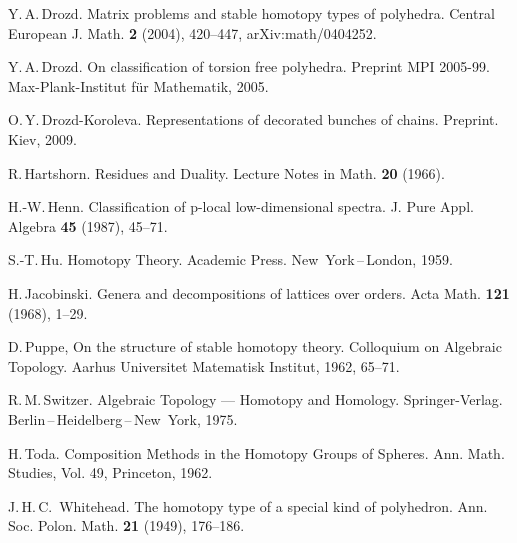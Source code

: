 \documentclass[12pt,a4paper]{amsart}
\theoremstyle{definition}
\theoremstyle{remark}
\numberwithin{equation}{section}
\begin{document}
\begin{thebibliography}{99}
 Y.\,A.\,Drozd.
 Matrix problems and stable homotopy types of polyhedra. Central
 European J. Math. {\bf2} (2004), 
 420--447, arXiv:math/0404252. 

 Y.\,A.\,Drozd.
 On classification of torsion free polyhedra. Preprint MPI 2005-99.
 Max-Plank-Institut f\"ur Mathematik, 2005.

 O.\,Y.\,Drozd-Koroleva. Representations of decorated bunches of
 chains. Preprint. Kiev, 2009.

 R.\,Hartshorn.
 Residues and Duality. Lecture Notes in  Math. {\bf20} (1966).

 H.-W.\,Henn.
Classification of p-local low-dimensional spectra.
J. Pure Appl. Algebra {\bf45} (1987), 45--71. 

 S.-T.\,Hu. Homotopy Theory. Academic Press. New~York\,--\,London, 1959.

 H.\,Jacobinski.
 Genera and decompositions of lattices over orders.
Acta Math. {\bf121} (1968), 1--29.

 D.\,Puppe, On the structure of stable homotopy theory. Colloquium on Algebraic
 Topology. Aarhus Universitet Matematisk Institut, 1962, 65--71.

  R.\,M.\,Switzer. 
  Algebraic Topology --- Homotopy and Homology.
  Springer-Verlag. Berlin\,--\,Heidelberg\,--\,New~York, 1975.

 H.\,Toda. Composition Methods in the Homotopy Groups of Spheres. Ann. Math.
 Studies, Vol. 49, Princeton, 1962.

  J.\,H.\,C.\, Whitehead. The homotopy type of a special kind of polyhedron. Ann. Soc.
 Polon. Math. {\bf21} (1949), 176--186.

 \end{thebibliography}
 
\end{document}
